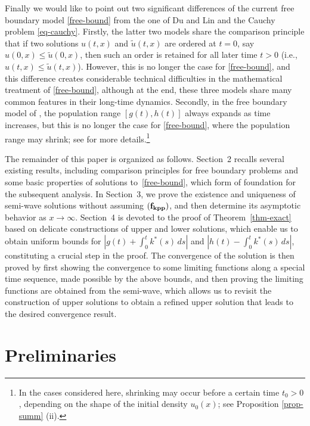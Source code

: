 \documentclass[11pt]{amsart}
\numberwithin{equation}{section}
\begin{document}
Finally we would like to point out two significant differences of the current free boundary model \eqref{free-bound} from the one of Du and Lin \cite{DL10,DL15} and the Cauchy problem \eqref{eq-cauchy}. Firstly, the latter two models share the comparison principle that if two  solutions  $u(t,x)$ and $\tilde u(t,x)$ are  ordered at $t=0$, say $u(0,x)\leq \tilde u(0,x)$, then such an order is retained for all  later time $t>0$ (i.e., $u(t,x)\leq \tilde u(t,x)$). However, this is no longer the case for \eqref{free-bound}, and this difference creates considerable technical difficulties in the mathematical treatment of \eqref{free-bound}, although at the end, these three models share many common features in their long-time dynamics. Secondly, in the free boundary model
of \cite{DL10,DL15}, the population range $[g(t), h(t)]$ always expands as time increases, but this is no longer the case for \eqref{free-bound}, where the population range may shrink; see \cite{CDN, DLNN} for more details.\footnote{In the cases considered here, shrinking may occur before a certain time $t_0>0$, depending on the shape of the initial density $u_0(x)$; see Proposition \ref{prop-summ} (ii).}  
\medskip

The remainder of this paper is organized as follows.
Section~2 recalls several existing results, including comparison principles for free boundary problems and some basic properties of solutions to~\eqref{free-bound}, which form of foundation for the subsequent analysis. In Section~3, we prove the existence and uniqueness of semi-wave solutions without assuming ${\bf (f_{kpp})}$,
 and then determine its  asymptotic behavior as \(x \to \infty\). 
Section~4 is devoted to the proof of Theorem~\ref{thm-exact} based on  delicate constructions of upper and lower solutions, which enable us to obtain uniform bounds for \( |g(t)+\int_0^t k^*(s)\,ds| \) and \( |h(t)-\int_0^t k^*(s)\,ds| \), constituting a crucial step  in the proof. The convergence of the solution
 is then proved by first showing the convergence to some limiting functions along a special time sequence, made possible by the above bounds, and then proving the limiting functions are obtained from the semi-wave, which allows us to  revisit the construction of upper solutions to obtain a refined upper solution that leads to the desired convergence result. 

 \section{Preliminaries}
\end{document}
